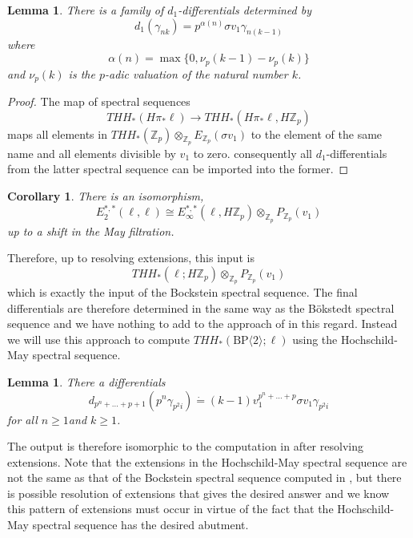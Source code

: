 \documentclass[12pt]{amsart}
\newcommand{\Z}{\mathbb{Z}}
\newtheorem{cor}[equation]{Corollary}
\newtheorem{lem}[equation]{Lemma}
\theoremstyle{definition}
\numberwithin{equation}{section}
\numberwithin{figure}{section}
\begin{document}
\begin{lem}
There is a family of $d_1$-differentials determined by 
\[ d_1(\gamma_{nk})=p^{\alpha(n)}\sigma v_1 \gamma_{n(k-1)}\]
where 
\[\alpha(n)=\max\{0,\nu_p(k-1)-\nu_p(k)\}\]
and $\nu_p(k)$ is the $p$-adic valuation of the natural number $k$.
\end{lem}
\begin{proof}
The map of spectral sequences 
\[ THH_*(H\pi_*\ell)\to THH_*(H\pi_*\ell,H\Z_p)\]
maps all elements in $THH_*(\Z_p)\otimes_{\Z_p}E_{\Z_p}(\sigma v_1)$ to the element of the same name and all elements divisible by $v_1$ to zero. consequently all $d_1$-differentials from the latter spectral sequence can be imported into the former. 
\end{proof}
\begin{cor}
There is an isomorphism, 
\[ E_2^{*,*}(\ell,\ell)\cong E_\infty^{*,*}(\ell,H\Z_p)\otimes_{\Z_p} P_{\Z_p}(v_1)\]
up to a shift in the May filtration. 
\end{cor}
Therefore, up to resolving extensions, this input is 
\[ THH_*(\ell;H\Z_p)\otimes_{\Z_p}P_{\Z_p}(v_1)\]
which is exactly the input of the Bockstein spectral sequence. The final differentials are therefore determined in the same way as the B\"okstedt spectral sequence and we have nothing to add to the approach of \cite{AHL} in this regard. Instead we will use this approach to compute $THH_*(\text{BP}\langle 2 \rangle; \ell)$ using the Hochschild-May spectral sequence. 

\begin{lem}
There a differentials 
\[ d_{p^n+\ldots +p+1}(p^n\gamma_{p^2i})\dot{=}(k-1)v_1^{p^n+\ldots+p}\sigma v_1 \gamma_{p^2i}\]
for all $n\ge 1$and $k\ge 1$.
\end{lem}

The output is therefore isomorphic to the computation in \cite{AHL} after resolving extensions. Note that the extensions in the Hochschild-May spectral sequence are not the same as that of the Bockstein spectral sequence computed in \cite{AHL}, but there is possible resolution of extensions that gives the desired answer and we know this pattern of extensions must occur in virtue of the fact that the Hochschild-May spectral sequence has the desired abutment.


\end{document}
